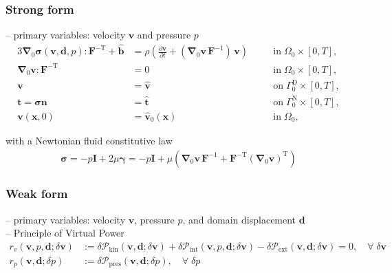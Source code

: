 \documentclass[a4paper,12pt]{report}
\newcommand{\bs}[1]{\boldsymbol{#1}}
\newcommand{\Om}{\mathit{\Omega}}
\newcommand{\Gm}{\mathit{\Gamma}}
\begin{document}
\subsubsection{Strong form}
-- primary variables: velocity $\bs{v}$ and pressure $p$
\begin{alignat}{3}
\bs{\nabla}_{0} \bs{\sigma}(\bs{v},\bs{d},p) : \bs{F}^{-\mathrm{T}} + \hat{\bs{b}} &= \rho\left(\frac{\partial\bs{v}}{\partial t} + (\bs{\nabla}_0\bs{v}\,\bs{F}^{-1})\,\bs{v}\right) \quad &&\text{in} \; \mathit{\Om}_0 \times [0, T], \label{eq:divsigma_ns} \\
\bs{\nabla}_{0}\bs{v} : \bs{F}^{-\mathrm{T}} &= 0 \quad &&\text{in} \; \mathit{\Om}_0 \times [0, T],\label{eq:divv_ns}\\
\bs{v} &= \hat{\bs{v}} \quad &&\text{on} \; \mathit{\Gm}_0^{\mathrm{D}} \times [0, T], \label{eq:bc_v_ns}\\
\bs{t} = \bs{\sigma}\bs{n} &= \hat{\bs{t}} \quad &&\text{on} \; \mathit{\Gm}_0^{\mathrm{N}} \times [0, T], \label{eq:bc_N_ns}\\
\bs{v}(\bs{x},0) &= \hat{\bs{v}}_{0}(\bs{x}) \quad &&\text{in} \; \mathit{\Om}_0, \label{eq:ini_v_ns}
\end{alignat}

with a Newtonian fluid constitutive law
\begin{align}
\bs{\sigma} = -p \bs{I} + 2 \mu \bs{\gamma} = -p \bs{I} + \mu \left(\bs{\nabla}_0 \bs{v}\,\bs{F}^{-1} + \bs{F}^{-\mathrm{T}}(\bs{\nabla}_0 \bs{v})^{\mathrm{T}}\right)
\end{align}

\subsubsection{Weak form}

-- primary variables: velocity $\bs{v}$, pressure $p$, and domain displacement $\bs{d}$\\

-- Principle of Virtual Power
\begin{align}
r_v(\bs{v},p,\bs{d};\delta\bs{v}) &:= \delta \mathcal{P}_{\mathrm{kin}}(\bs{v},\bs{d};\delta\bs{v}) + \delta \mathcal{P}_{\mathrm{int}}(\bs{v},p,\bs{d};\delta\bs{v}) - \delta \mathcal{P}_{\mathrm{ext}}(\bs{v},\bs{d};\delta\bs{v}) = 0, \quad \forall \; \delta\bs{v} \label{eq:res_v_fluid_ale}\\
r_p(\bs{v},\bs{d};\delta p) &:= \delta \mathcal{P}_{\mathrm{pres}}(\bs{v},\bs{d};\delta p), \quad \forall \; \delta p \label{eq:res_p_fluid_ale}
\end{align}
\end{document}
